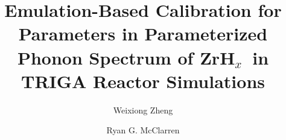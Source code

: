 \documentclass[review]{elsarticle}
\newcommand{\zh}{ZrH$_x$}
\newcommand{\TAMU}{Texas A\&M University}
\begin{document}
\begin{frontmatter}

\title{Emulation-Based Calibration for Parameters in Parameterized Phonon Spectrum of \zh~{in TRIGA Reactor Simulations}}

\author[mymainaddress]{Weixiong Zheng}

\author[mymainaddress]{Ryan G. McClarren}

\address[mymainaddress]{Department of Nuclear Engineering, Dwight Look College of Engineering, \TAMU,~College Station, TX 77843-3133}


\end{frontmatter}
\end{document}
